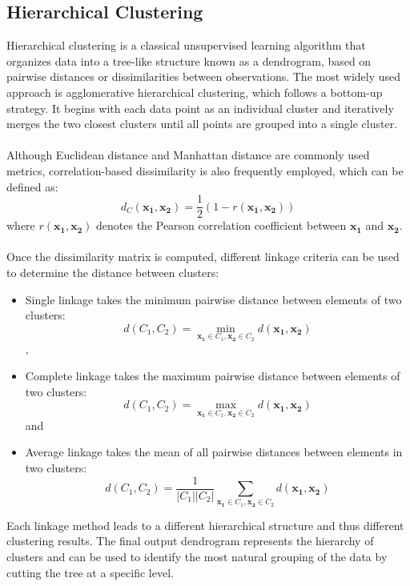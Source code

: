 \subsection{Hierarchical Clustering}
Hierarchical clustering is a classical unsupervised learning algorithm that organizes data into a tree-like structure known as a dendrogram, based on pairwise distances or dissimilarities between observations. The most widely used approach is agglomerative hierarchical clustering, which follows a bottom-up strategy. It begins with each data point as an individual cluster and iteratively merges the two closest clusters until all points are grouped into a single cluster. \\
\\
Although Euclidean distance and Manhattan distance are commonly used metrics, correlation-based dissimilarity is also frequently employed, which can be defined as:\\
\begin{equation}
	d_C(\boldsymbol{x_1},\boldsymbol{x_2})=\frac{1}{2}(1-r(\boldsymbol{x_1},\boldsymbol{x_2}))
\end{equation}
where $r(\boldsymbol{x_1},\boldsymbol{x_2})$ denotes the Pearson correlation coefficient between $\boldsymbol{x_1}$ and $\boldsymbol{x_2}$.\\
\\
Once the dissimilarity matrix is computed, different linkage criteria can be used to determine the distance between clusters:\\
\begin{itemize}
 \item Single linkage takes the minimum pairwise distance between elements of two clusters:
  $$d(C_1,C_2)=\min_{\boldsymbol{x_1} \in C_1, \boldsymbol{x_2} \in C_2} d(\boldsymbol{x_1},\boldsymbol{x_2})$$,
 \item Complete linkage takes the maximum pairwise distance between elements of two clusters:
  $$d(C_1,C_2)=\max_{\boldsymbol{x_1} \in C_1, \boldsymbol{x_2} \in C_2} d(\boldsymbol{x_1},\boldsymbol{x_2})$$ and
 \item Average linkage takes the mean of all pairwise distances between elements in two clusters:
  $$d(C_1,C_2)=\frac{1}{|C_1||C_2|}\sum_{\boldsymbol{x_1} \in C_1, \boldsymbol{x_2} \in C_2} d(\boldsymbol{x_1},\boldsymbol{x_2})$$
\end{itemize}
Each linkage method leads to a different hierarchical structure and thus different clustering results. The final output dendrogram represents the hierarchy of clusters and can be used to identify the most natural grouping of the data by cutting the tree at a specific level.\\
\\
